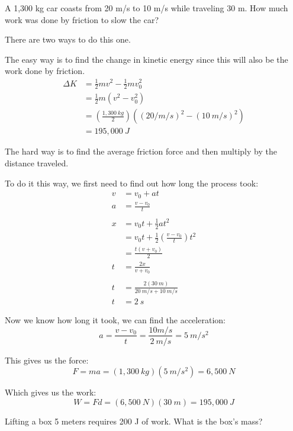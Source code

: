 \documentclass[fleqn,addpoints]{exam}
\begin{document}
\begin{questions}
\question[5] A 1,300 kg car coasts from 20 m/s to 10 m/s while traveling 30 m.
How much work was done by friction to slow the car?

\begin{solution}
There are two ways to do this one.

The easy way is to find the change in kinetic energy since this will also be the work done by friction.
\begin{align*}
  \Delta K &= \frac{1}{2} mv^2 - \frac{1}{2} m v_0^2 \\
           &= \frac{1}{2} m (v^2 - v_0^2) \\
           &= \left( \frac{1,300 \ kg}{2} \right) ((20 / m/s)^2 - (10 \ m/s)^2) \\
           &= 195,000 \ J
\end{align*}

The hard way is to find the average friction force and then multiply by the distance traveled.

To do it this way, we first need to find out how long the process took:
\begin{align*}
  v &= v_0 + at \\
  a &= \frac{v - v_0}{t} \\
  \\
  x &= v_0t + \frac{1}{2} at^2 \\
    &= v_0t + \frac{1}{2} \left( \frac{v - v_0}{t} \right) t^2 \\
    &= \frac{t(v + v_0)}{2} \\
  t &= \frac{2x}{v + v_0} \\
  \\
  t &= \frac{2 (30 \ m)}{20 \ m/s + 10 \ m/s} \\
  t &= 2 \ s
\end{align*}

Now we know how long it took, we can find the acceleration:
\[
  a = \frac{v - v_0}{t} = \frac{10 m/s}{2 \ m/s} = 5 \ m/s^2
\]

This gives us the force:
\[
  F = ma = (1,300 \ kg)(5 \ m/s^2) = 6,500 \ N
\]

Which gives us the work:
\[
  W = Fd = (6,500 \ N)(30 \ m) = 195,000 \ J 
\]

\end{solution}

\question[5]
Lifting a box 5 meters requires 200 J of work.  What is the box's mass?

\begin{solution}


\end{solution}
\end{questions}
\end{document}
